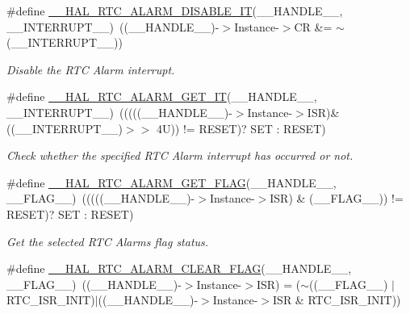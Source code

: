 \begin{DoxyCompactItemize}
\#define \hyperlink{group___r_t_c___exported___macros_gadc2d6dc4a75136bdd2b67c1b35d04b10}{\+\_\+\+\_\+\+H\+A\+L\+\_\+\+R\+T\+C\+\_\+\+A\+L\+A\+R\+M\+\_\+\+D\+I\+S\+A\+B\+L\+E\+\_\+\+IT}(\+\_\+\+\_\+\+H\+A\+N\+D\+L\+E\+\_\+\+\_\+,  \+\_\+\+\_\+\+I\+N\+T\+E\+R\+R\+U\+P\+T\+\_\+\+\_\+)~((\+\_\+\+\_\+\+H\+A\+N\+D\+L\+E\+\_\+\+\_\+)-\/$>$Instance-\/$>$CR \&= $\sim$(\+\_\+\+\_\+\+I\+N\+T\+E\+R\+R\+U\+P\+T\+\_\+\+\_\+))
\begin{DoxyCompactList}\small\item\em Disable the R\+TC Alarm interrupt. \end{DoxyCompactList}\item 
\#define \hyperlink{group___r_t_c___exported___macros_gaf748b95b91cca959f79f441a90678c60}{\+\_\+\+\_\+\+H\+A\+L\+\_\+\+R\+T\+C\+\_\+\+A\+L\+A\+R\+M\+\_\+\+G\+E\+T\+\_\+\+IT}(\+\_\+\+\_\+\+H\+A\+N\+D\+L\+E\+\_\+\+\_\+,  \+\_\+\+\_\+\+I\+N\+T\+E\+R\+R\+U\+P\+T\+\_\+\+\_\+)~(((((\+\_\+\+\_\+\+H\+A\+N\+D\+L\+E\+\_\+\+\_\+)-\/$>$Instance-\/$>$I\+SR)\& ((\+\_\+\+\_\+\+I\+N\+T\+E\+R\+R\+U\+P\+T\+\_\+\+\_\+)$>$$>$ 4\+U)) != R\+E\+S\+E\+T)? S\+E\+T \+: R\+E\+S\+E\+T)
\begin{DoxyCompactList}\small\item\em Check whether the specified R\+TC Alarm interrupt has occurred or not. \end{DoxyCompactList}\item 
\#define \hyperlink{group___r_t_c___exported___macros_ga9f908cb1fd0f270c66f5deed82e019de}{\+\_\+\+\_\+\+H\+A\+L\+\_\+\+R\+T\+C\+\_\+\+A\+L\+A\+R\+M\+\_\+\+G\+E\+T\+\_\+\+F\+L\+AG}(\+\_\+\+\_\+\+H\+A\+N\+D\+L\+E\+\_\+\+\_\+,  \+\_\+\+\_\+\+F\+L\+A\+G\+\_\+\+\_\+)~(((((\+\_\+\+\_\+\+H\+A\+N\+D\+L\+E\+\_\+\+\_\+)-\/$>$Instance-\/$>$I\+SR) \& (\+\_\+\+\_\+\+F\+L\+A\+G\+\_\+\+\_\+)) != R\+E\+S\+ET)? S\+ET \+: R\+E\+S\+ET)
\begin{DoxyCompactList}\small\item\em Get the selected R\+TC Alarm\textquotesingle{}s flag status. \end{DoxyCompactList}\item 
\#define \hyperlink{group___r_t_c___exported___macros_ga93d88df67428f617157346d7cbdb4069}{\+\_\+\+\_\+\+H\+A\+L\+\_\+\+R\+T\+C\+\_\+\+A\+L\+A\+R\+M\+\_\+\+C\+L\+E\+A\+R\+\_\+\+F\+L\+AG}(\+\_\+\+\_\+\+H\+A\+N\+D\+L\+E\+\_\+\+\_\+,  \+\_\+\+\_\+\+F\+L\+A\+G\+\_\+\+\_\+)~((\+\_\+\+\_\+\+H\+A\+N\+D\+L\+E\+\_\+\+\_\+)-\/$>$Instance-\/$>$I\+SR) = ($\sim$((\+\_\+\+\_\+\+F\+L\+A\+G\+\_\+\+\_\+) $\vert$ R\+T\+C\+\_\+\+I\+S\+R\+\_\+\+I\+N\+IT)$\vert$((\+\_\+\+\_\+\+H\+A\+N\+D\+L\+E\+\_\+\+\_\+)-\/$>$Instance-\/$>$I\+SR \& R\+T\+C\+\_\+\+I\+S\+R\+\_\+\+I\+N\+IT))
$$
\end{DoxyCompactItemize}
